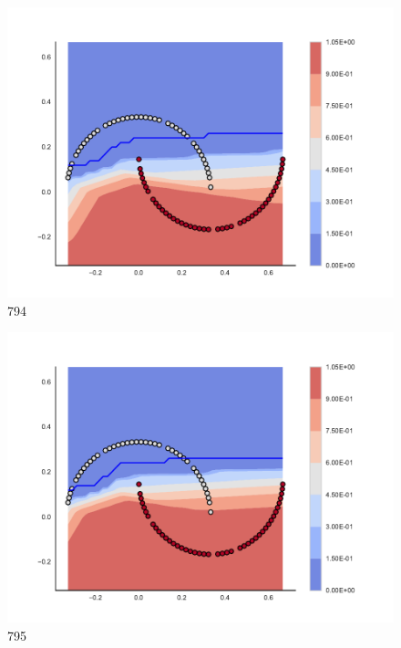 \begin{subfigure}[b]{0.09\textwidth}
    \includegraphics[clip, trim=2.35cm 1.75cm 4.5cm 0cm,width=\textwidth]{img/convergence/794.pdf}
    \caption{794}
    \label{fig:convergence_794}
\end{subfigure}
%
\begin{subfigure}[b]{0.09\textwidth}
    \includegraphics[clip, trim=2.35cm 1.75cm 4.5cm 0cm,width=\textwidth]{img/convergence/795.pdf}
    \caption{795}
    \label{fig:convergence_795}
\end{subfigure}
%
